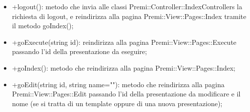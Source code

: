 {{\begin{itemize}
							\item +logout(): metodo che invia alle classi Premi::Controller::IndexControllers la richiesta di logout, e reindirizza alla pagina Premi::View::Pages::Index tramite il metodo goIndex();
							\item +goExecute(string id): reindirizza alla pagina Premi::View::Pages::Execute passando l'id della presentazione da eseguire;		
							\item +goIndex(): metodo che reindirizza alla pagina Premi::View::Pages::Index;
							\item +goEdit(string id, string name=""): metodo che reindirizza alla pagina Premi::View::Pages::Edit passando l'id della presentazione da modificare e il nome (se si tratta di un template oppure di una nuova presentazione);
						\end{itemize}
					}
}
